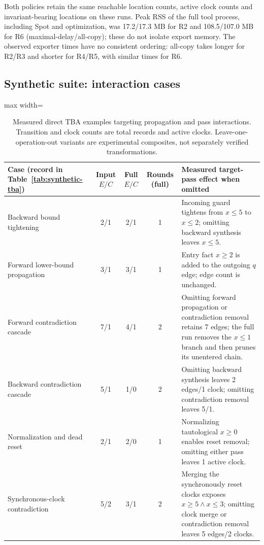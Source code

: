 Both policies retain the same reachable location counts, active clock counts and invariant-bearing locations on these runs. Peak RSS of the full tool process, including Spot and optimization, was 17.2/17.3 MB for R2 and 108.5/107.0 MB for R6 (maximal-delay/all-copy); these do not isolate export memory. The observed exporter times have no consistent ordering: all-copy takes longer for R2/R3 and shorter for R4/R5, with similar times for R6.

\subsection{Synthetic suite: interaction cases}
\begin{table}[tp]
\centering
\caption{Measured direct TBA examples targeting propagation and pass interactions. Transition and clock counts are total records and active clocks. Leave-one-operation-out variants are experimental composites, not separately verified transformations.}
\label{tab:synthetic-interactions}
\scriptsize
\setlength{\tabcolsep}{3pt}
\begin{adjustbox}{max width=\textwidth}\begin{tabular}{@{}p{}cccp{}@{}}
\toprule
Case (record in Table~\ref{tab:synthetic-tba}) & Input $E/C$ & Full $E/C$ & Rounds (full) & Measured target-pass effect when omitted\\
\midrule
Backward bound tightening & 2/1 & 2/1 & 1 & Incoming guard tightens from $x\leq5$ to $x\leq2$; omitting backward synthesis leaves $x\leq5$.\\
Forward lower-bound propagation & 3/1 & 3/1 & 1 & Entry fact $x\geq2$ is added to the outgoing $q$ edge; edge count is unchanged.\\
Forward contradiction cascade & 7/1 & 4/1 & 2 & Omitting forward propagation or contradiction removal retains 7 edges; the full run removes the $x\leq1$ branch and then prunes its unentered chain.\\
Backward contradiction cascade & 5/1 & 1/0 & 2 & Omitting backward synthesis leaves 2 edges/1 clock; omitting contradiction removal leaves 5/1.\\
Normalization and dead reset & 2/1 & 2/0 & 1 & Normalizing tautological $x\geq0$ enables reset removal; omitting either pass leaves 1 active clock.\\
Synchronous-clock contradiction & 5/2 & 3/1 & 2 & Merging the synchronously reset clocks exposes $x\geq5\land x\leq3$; omitting clock merge or contradiction removal leaves 5 edges/2 clocks.\\
\bottomrule
\end{tabular}\end{adjustbox}
\end{table}

